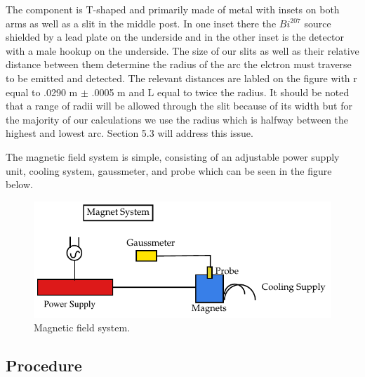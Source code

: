 The component is T-shaped and primarily made of metal with insets on both arms as well as a slit in the middle post.  In one inset there the $Bi^{207}$ source shielded by a lead plate on the underside and in the other inset is the detector with a male hookup on the underside.  The size of our slits as well as their relative distance between them  determine the radius of the arc the elctron must traverse to be emitted and detected. The relevant distances are labled on the figure with r equal to .0290 m $\pm$ .0005 m and L equal to twice the radius.  It should be noted that a range of radii will be allowed through the slit because of its width but for the majority of our calculations we use the radius which is halfway between the highest and lowest arc. Section 5.3 will address this issue. 

The magnetic field system is simple, consisting of an adjustable power supply unit, cooling system, gaussmeter, and probe which can be seen in the figure below. 

\begin{figure}[H]
\begin{center}
\includegraphics[width=4 in]{REM-figures3.pdf}
\caption{Magnetic field system.}
\end{center}
\end{figure}

\subsection{Procedure}

